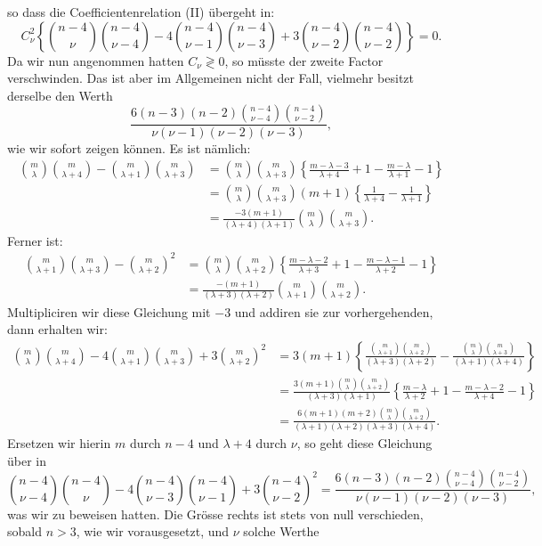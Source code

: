 \documentclass[11pt]{article}
\providecommand{\weberpage}[1]{}
\providecommand{\weq}[2]{\begin{equation}\tag{#1}#2\end{equation}}
\begin{document}
\weberpage{207}
so dass die Coefficientenrelation (II) \"ubergeht in:
\[
C_\nu^2\left\{\binom{n-4}{\nu}\binom{n-4}{\nu-4} - 4\binom{n-4}{\nu-1}\binom{n-4}{\nu-3} + 3\binom{n-4}{\nu-2}\binom{n-4}{\nu-2}\right\} = 0.
\]
Da wir nun angenommen hatten $C_\nu \gtrless 0$, so m\"usste der
zweite Factor verschwinden. Das ist aber im Allgemeinen nicht der
Fall, vielmehr besitzt derselbe den Werth
\[
\frac{6(n-3)(n-2)\binom{n-4}{\nu-4}\binom{n-4}{\nu-2}}{\nu(\nu-1)(\nu-2)(\nu-3)},
\]
wie wir sofort zeigen k\"onnen. Es ist n\"amlich:
\[
\begin{aligned}
\binom{m}{\lambda}\binom{m}{\lambda+4} - \binom{m}{\lambda+1}\binom{m}{\lambda+3} &= \binom{m}{\lambda}\binom{m}{\lambda+3}\left\{\frac{m-\lambda-3}{\lambda+4} + 1 - \frac{m-\lambda}{\lambda+1} - 1\right\}\\
&= \binom{m}{\lambda}\binom{m}{\lambda+3}(m+1)\left\{\frac{1}{\lambda+4} - \frac{1}{\lambda+1}\right\}\\
&= \frac{-3(m+1)}{(\lambda+4)(\lambda+1)}\binom{m}{\lambda}\binom{m}{\lambda+3}.
\end{aligned}
\]
Ferner ist:
\[
\begin{aligned}
\binom{m}{\lambda+1}\binom{m}{\lambda+3} - \binom{m}{\lambda+2}^2 &= \binom{m}{\lambda}\binom{m}{\lambda+2}\left\{\frac{m-\lambda-2}{\lambda+3} + 1 - \frac{m-\lambda-1}{\lambda+2} - 1\right\}\\
&= \frac{-(m+1)}{(\lambda+3)(\lambda+2)}\binom{m}{\lambda+1}\binom{m}{\lambda+2}.
\end{aligned}
\]
Multipliciren wir diese Gleichung mit $-3$ und addiren sie zur
vorhergehenden, dann erhalten wir:
\[
\begin{aligned}
\binom{m}{\lambda}\binom{m}{\lambda+4} - 4\binom{m}{\lambda+1}\binom{m}{\lambda+3} + 3\binom{m}{\lambda+2}^2 &= 3(m+1)\left\{\frac{\binom{m}{\lambda+1}\binom{m}{\lambda+2}}{(\lambda+3)(\lambda+2)} - \frac{\binom{m}{\lambda}\binom{m}{\lambda+3}}{(\lambda+1)(\lambda+4)}\right\}\\
&= \frac{3(m+1)\binom{m}{\lambda}\binom{m}{\lambda+2}}{(\lambda+3)(\lambda+1)}\left\{\frac{m-\lambda}{\lambda+2} + 1 - \frac{m-\lambda-2}{\lambda+4} - 1\right\}\\
&= \frac{6(m+1)(m+2)\binom{m}{\lambda}\binom{m}{\lambda+2}}{(\lambda+1)(\lambda+2)(\lambda+3)(\lambda+4)}.
\end{aligned}
\]
Ersetzen wir hierin $m$ durch $n-4$ und $\lambda+4$ durch $\nu$, so
geht diese Gleichung \"uber in
\weq{III}{\binom{n-4}{\nu-4}\binom{n-4}{\nu} - 4\binom{n-4}{\nu-3}\binom{n-4}{\nu-1} + 3\binom{n-4}{\nu-2}^2 = \frac{6(n-3)(n-2)\binom{n-4}{\nu-4}\binom{n-4}{\nu-2}}{\nu(\nu-1)(\nu-2)(\nu-3)},}
was wir zu beweisen hatten. Die Gr\"osse rechts ist stets von null
verschieden, sobald $n > 3$, wie wir vorausgesetzt, und $\nu$ solche
Werthe
\end{document}
